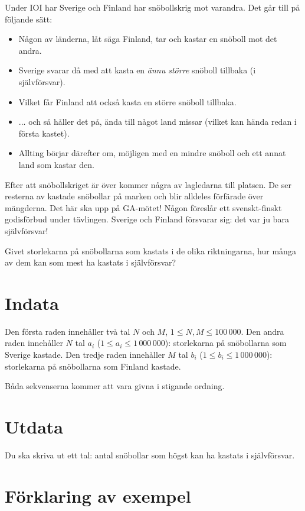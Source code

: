 
Under IOI har Sverige och Finland har snöbollskrig mot varandra. Det går till på följande sätt:

\begin{itemize}
  \item Någon av länderna, låt säga Finland, tar och kastar en snöboll mot det andra.
  \item Sverige svarar då med att kasta en \emph{ännu större} snöboll tillbaka (i självförsvar).
  \item Vilket får Finland att också kasta en större snöboll tillbaka.
  \item ... och så håller det på, ända till något land missar (vilket kan hända redan i första kastet).
  \item Allting börjar därefter om, möjligen med en mindre snöboll och ett annat land som kastar den.
\end{itemize}

Efter att snöbollskriget är över kommer några av lagledarna till platsen.
De ser resterna av kastade snöbollar på marken och blir alldeles förfärade över mängderna.
Det här ska upp på GA-mötet! Någon föreslår ett svenskt-finskt godisförbud under tävlingen.
Sverige och Finland försvarar sig: det var ju bara självförsvar!

Givet storlekarna på snöbollarna som kastats i de olika riktningarna, hur många av dem kan som mest ha kastats i självförsvar?

\section*{Indata}

Den första raden innehåller två tal $N$ och $M$, $1 \le N,M \le 100\,000$.
Den andra raden innehåller $N$ tal $a_i$ ($1 \le a_i \le 1\,000\,000$): storlekarna på snöbollarna som Sverige kastade.
Den tredje raden innehåller $M$ tal $b_i$ ($1 \le b_i \le 1\,000\,000$): storlekarna på snöbollarna som Finland kastade.

Båda sekvenserna kommer att vara givna i stigande ordning.

\section*{Utdata}

Du ska skriva ut ett tal: antal snöbollar som högst kan ha kastats i självförsvar.

\section*{Förklaring av exempel}

